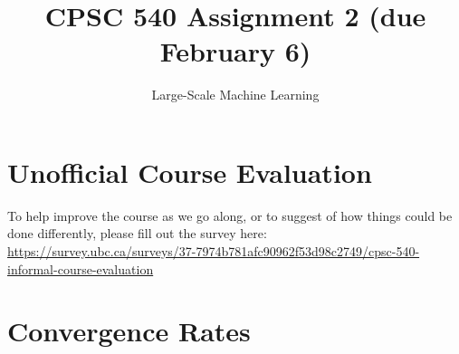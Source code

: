 \documentclass{article}
\begin{document}
\def\blu#1{{\color{blu}#1}}
\def\gre#1{{\color{gre}#1}}
\def\red#1{{\color{red}#1}}
\def\norm#1{\|#1\|}
\newcommand{\argmin}[1]{\mathop{\hbox{argmin}}_{#1}}
\newcommand{\argmax}[1]{\mathop{\hbox{argmax}}_{#1}}
\def\R{\mathbb{R}}
\newcommand{\fig}[2]{\texttt{[image: a2f/\#2]}}
\newcommand{\centerfig}[2]{\begin{center}\texttt{[image: a2f/\#2]}\end{center}}
\def\items#1{\begin{itemize}#1\end{itemize}}
\def\enum#1{\begin{enumerate}#1\end{enumerate}}
\def\argmax{\mathop{\rm arg\,max}}
\def\argmin{\mathop{\rm arg\,min}}
\def\half{\frac 1 2}
\newcommand{\code}[1]{}
\newcommand{\alignStar}[1]{\begin{align*}#1\end{align*}}

\newcommand{\E}{\mathbb E}
\newcommand{\ip}[1]{\ensuremath{\langle #1\rangle}}
\newcommand{\irrats}{\ensuremath{\mathbb{R}\setminus\mathbb{Q}}}
\newcommand{\rats}{\ensuremath{\mathbb{Q}}}
\newcommand{\reals}{\ensuremath{\mathbb{R}}}
\newcommand{\nats}{\ensuremath{\mathbb{N}}}
\newcommand{\ints}{\ensuremath{\mathbb{Z}}}
\newcommand{\complex}{\ensuremath{\mathbb{C}}}


\title{CPSC 540 Assignment 2 (due February 6)}
\author{Large-Scale Machine Learning}
\date{}
\maketitle

\setcounter{section}{-1}
\section{Unofficial Course Evaluation}

To help improve the course as we go along, or to suggest of how things could be done differently, please fill out the survey here:\\
\url{https://survey.ubc.ca/surveys/37-7974b781afc90962f53d98c2749/cpsc-540-informal-course-evaluation}

\section{Convergence Rates}
\end{document}
